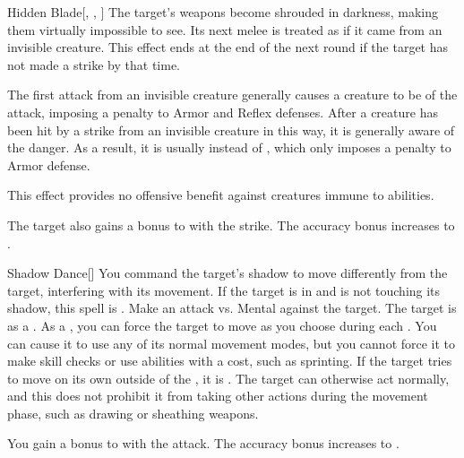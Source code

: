 \lowercase{\hypertarget{spell:Hidden Blade}{}}\label{spell:Hidden Blade}
\begin{freeability}[Rank 3]{\hypertarget{spell:Hidden Blade}{Hidden Blade}}[, , ]
The target's weapons become shrouded in darkness, making them virtually impossible to see.
Its next melee  is treated as if it came from an invisible creature.
This effect ends at the end of the next round if the target has not made a strike by that time.

The first attack from an invisible creature generally causes a creature to be  of the attack, imposing a  penalty to Armor and Reflex defenses.
After a creature has been hit by a strike from an invisible creature in this way, it is generally aware of the danger.
As a result, it is usually  instead of , which only imposes a  penalty to Armor defense.

This effect provides no offensive benefit against creatures immune to  abilities.

\rankline
{} The target also gains a  bonus to  with the strike.
 The accuracy bonus increases to .
\end{freeability}
\vspace{0.25em}



\lowercase{\hypertarget{spell:Shadow Dance}{}}\label{spell:Shadow Dance}
\begin{freeability}[Rank 3]{\hypertarget{spell:Shadow Dance}{Shadow Dance}}[]
You command the target's shadow to move differently from the target, interfering with its movement.
If the target is in  and is not touching its shadow, this spell is .
Make an attack vs. Mental against the target.
\hit The target is  as a .
\crit As a , you can force the target to move as you choose during each .
You can cause it to use any of its normal movement modes, but you cannot force it to make skill checks or use abilities with a cost, such as sprinting.
If the target tries to move on its own outside of the , it is .
The target can otherwise act normally, and this does not prohibit it from taking other actions during the movement phase, such as drawing or sheathing weapons.

\rankline
{} You gain a  bonus to  with the attack.
 The accuracy bonus increases to .
\end{freeability}
\vspace{0.25em}



